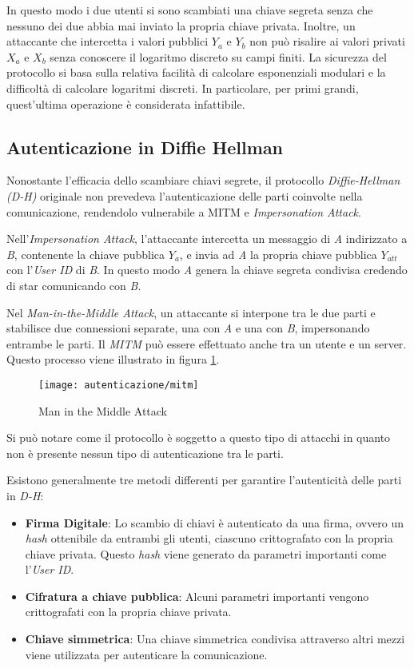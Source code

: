 In questo modo i due utenti si sono scambiati una chiave segreta senza che nessuno dei due abbia mai inviato la propria chiave privata.
Inoltre, un attaccante che intercetta i valori pubblici $Y_a$ e $Y_b$ non può risalire ai valori privati $X_a$ e $X_b$ senza conoscere il logaritmo discreto su campi finiti.
La sicurezza del protocollo si basa sulla relativa facilità di calcolare esponenziali modulari e la difficoltà di calcolare logaritmi discreti. In particolare, per primi grandi, quest'ultima operazione è considerata infattibile.


\subsection{Autenticazione in Diffie Hellman}
Nonostante l'efficacia dello scambiare chiavi segrete, il protocollo \emph{Diffie-Hellman (D-H)} originale non prevedeva l'autenticazione delle parti coinvolte nella comunicazione, rendendolo vulnerabile a MITM e \emph{\gls{Impersonation Attack}}.

Nell'\emph{Impersonation Attack}, l'attaccante intercetta un messaggio di \emph{A} indirizzato a \emph{B}, contenente la chiave pubblica $Y_a$, e invia ad \emph{A} la propria chiave pubblica $Y_{att}$ con l'\emph{User ID} di \emph{B}.
In questo modo \emph{A} genera la chiave segreta condivisa credendo di star comunicando con \emph{B}.

Nel \emph{Man-in-the-Middle Attack}, un attaccante si interpone tra le due parti e stabilisce due connessioni separate, una con \emph{A} e una con \emph{B}, impersonando entrambe le parti. Il \emph{MITM} può essere effettuato anche tra un utente e un server. Questo processo viene illustrato in figura \ref{fig:mitm}.

\begin{figure}[!ht] 
    \centering 
    \texttt{[image: autenticazione/mitm]} 
    \caption{Man in the Middle Attack \cite{site:mitm-image}}
	\label{fig:mitm}
\end{figure}

Si può notare come il protocollo è soggetto a questo tipo di attacchi in quanto non è presente nessun tipo di autenticazione tra le parti.

\noindent Esistono generalmente tre metodi differenti per garantire l'autenticità delle parti in \emph{D-H}:
\begin{itemize}
	\item \textbf{Firma Digitale}: Lo scambio di chiavi è autenticato da una firma, ovvero un \emph{hash} ottenibile da entrambi gli utenti, ciascuno crittografato con la propria chiave privata. Questo \emph{hash} viene generato da parametri importanti come l'\emph{User ID}.
	\item \textbf{Cifratura a chiave pubblica}: Alcuni parametri importanti vengono crittografati con la propria chiave privata.
	\item \textbf{Chiave simmetrica}: Una chiave simmetrica condivisa attraverso altri mezzi viene utilizzata per autenticare la comunicazione.
\end{itemize}

